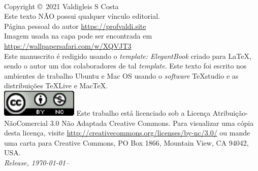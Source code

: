 \newpage
~\vfill
\thispagestyle{empty}

\noindent Copyright \copyright\ 2021 Valdigleis S Costa\\ %

\noindent Este texto  \textsc{NÃO}  possui qualquer vínculo editorial.\\ %

\noindent Página pessoal do autor \url{https://profvaldi.site}\\ 

\noindent Imagem usada na capa pode ser encontrada em \url{https://wallpapersafari.com/w/XQVJT3}\\

\noindent Este manuscrito é redigido usando o \textit{template: 	ElegantBook} criado para \LaTeX, sendo o autor um dos colaboradores de tal \textit{template}. Este texto foi escrito nos ambientes de trabalho Ubuntu e Mac OS usando o \textit{software} TeXstudio e as distribuições TeXLive e MacTeX. \\ 

\noindent \includegraphics[width=0.09\linewidth]{figure/license.pdf}  Este trabalho está licenciado sob a Licença Atribuição-NãoComercial 3.0 Não Adaptada Creative Commons. Para visualizar uma cópia desta licença, visite \url{http://creativecommons.org/licenses/by-nc/3.0/} ou mande uma carta para Creative Commons, PO Box 1866, Mountain View, CA 94042, USA.\\


\noindent \textit{Release, \today--\currenttime} %